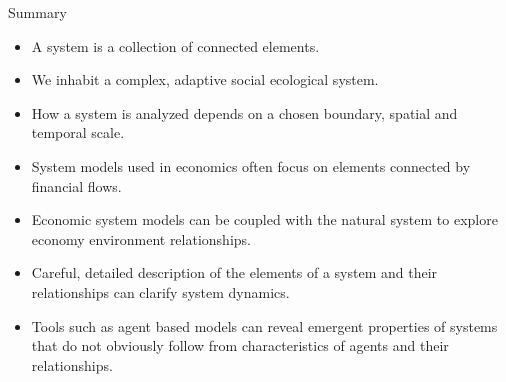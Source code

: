 \begin{frame}{Summary}
	\begin{itemize}
		\item A system is a collection of connected elements.
		\item We inhabit a complex, adaptive social ecological system.
		\item How a system is analyzed depends on a chosen boundary, spatial and temporal scale.
		\item System models used in economics often focus on elements connected by financial flows.
		\item Economic system models can be coupled with the natural system to explore economy environment relationships.
		\item Careful, detailed description of the elements of a system and their relationships can clarify system dynamics.
		\item Tools such as agent based models can reveal emergent properties of systems that do not obviously follow from characteristics of agents and their relationships.
	\end{itemize}
\end{frame}